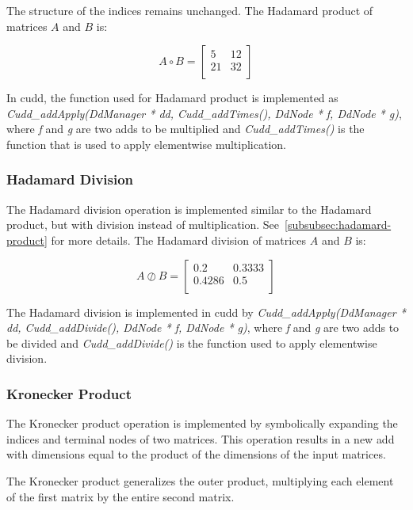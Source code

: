 The structure of the indices remains unchanged.
The Hadamard product of matrices $A$ and $B$ is:

\[
    A \circ B = \begin{bmatrix}
                    5  & 12 \\
                    21 & 32 \\
    \end{bmatrix}
\]

In \gls{cudd}, the function used for Hadamard product is implemented as \textit{Cudd\_addApply(DdManager * dd, Cudd\_addTimes(), DdNode * f, DdNode * g)}, where \textit{f} and \textit{g} are two \glspl{add} to be multiplied and \textit{Cudd\_addTimes()} is the function that is used to apply elementwise multiplication.

\subsubsection{Hadamard Division}
The Hadamard division operation is implemented similar to the Hadamard product, but with division instead of multiplication.
See~\autoref{subsubsec:hadamard-product} for more details.
The Hadamard division of matrices $A$ and $B$ is:

\[
    A \oslash B = \begin{bmatrix}
                      0.2    & 0.3333 \\
                      0.4286 & 0.5    \\
    \end{bmatrix}
\]

The Hadamard division is implemented in \gls{cudd} by \textit{Cudd\_addApply(DdManager * dd, Cudd\_addDivide(), DdNode * f, DdNode * g)}, where \textit{f} and \textit{g} are two \glspl{add} to be divided and \textit{Cudd\_addDivide()} is the function used to apply elementwise division.

\subsubsection{Kronecker Product}\label{subsubsec:kronecker-product}
The Kronecker product operation is implemented by symbolically expanding the indices and terminal nodes of two matrices.
This operation results in a new \gls{add} with dimensions equal to the product of the dimensions of the input matrices.

The Kronecker product generalizes the outer product, multiplying each element of the first matrix by the entire second matrix.

